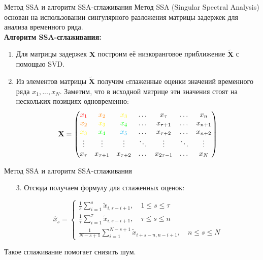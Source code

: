 \begin{frame}{Метод SSA и алгоритм SSA-сглаживания}
Метод SSA (Singular Spectral Analysis) основан на использовании сингулярного разложения матрицы задержек для анализа временного ряда.\\
\textbf{Алгоритм SSA-сглаживания:}
\begin{enumerate}
    \item Для матрицы задержек $\mathbf{X}$ построим её низкоранговое приближение $\tilde{\mathbf{X}}$ с помощью SVD.
    \item Из элементов матрицы $\tilde{\mathbf{X}}$ получим cглаженные оценки значений временного ряда $x_1, ..., x_N$. Заметим, что в исходной матрице эти значения стоят на нескольких позициях одновременно:
    $$ \mathbf{X} = \begin{pmatrix}
    \textcolor{red}{x_1} & \textcolor{orange}{x_2} & \textcolor{yellow}{x_3} & \dots & x_{\tau} & \dots & x_n \\
    \textcolor{orange}{x_2} & \textcolor{yellow}{x_3} & \textcolor{green}{x_4} & \dots & x_{\tau + 1} & \dots & x_{n + 1} \\
    \textcolor{yellow}{x_3} & \textcolor{green}{x_4} & \textcolor{cyan}{x_5} & \dots & x_{\tau + 2} & \dots & x_{n + 2} \\
    \vdots & \vdots & \vdots & \ddots & \vdots & \ddots & \vdots \\
    x_{\tau} & x_{\tau + 1} & x_{\tau + 2} & \dots & x_{2\tau - 1} & \dots & x_N 
    \end{pmatrix} $$

\end{enumerate}

\end{frame}
\begin{frame}{Метод SSA и алгоритм SSA-сглаживания}
    \begin{enumerate}
        \item[3.] Отсюда получаем формулу для сглаженных оценок:

$$
\hat{x}_s = 
\begin{cases}
\displaystyle\frac{1}{s} \sum_{i=1}^s \tilde{x}_{i, s-i+1}, \quad 1 \leq s \leq \tau \\
\displaystyle\frac{1}{\tau} \sum_{i=1}^{\tau} \tilde{x}_{i, s-i+1}, \quad \tau \leq s \leq n\\
\displaystyle\frac{1}{N-s+1} \sum_{i=1}^{N-s+1} \tilde{x}_{i + s - n, n-i+1}, \quad n \leq s \leq N
\end{cases}
$$
    \end{enumerate}

    Такое сглаживание помогает снизить шум.
    
\end{frame}
